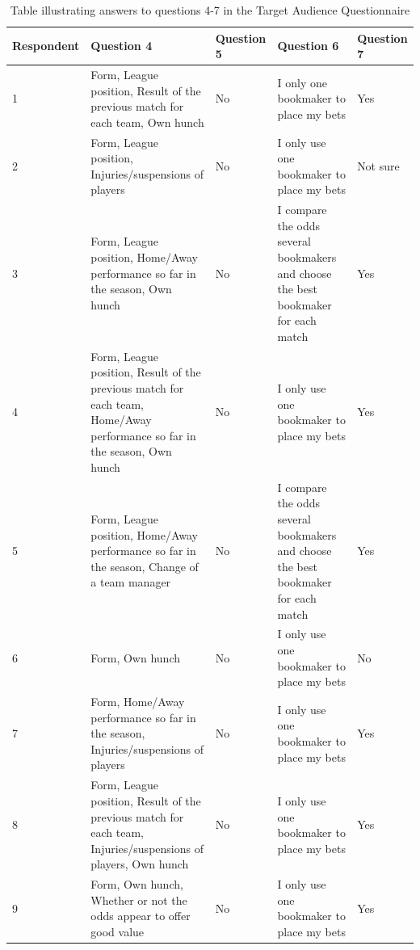 \noindent
\begin{table}
\begin{tabular}{
  |p{}%
  |p{}%
  |p{}%
  |p{}%
  |p{}|%
  }
  \hline
  \centering Respondent  & \centering Question 4  & \centering Question 5 &  \centering Question 6 & \centering\arraybackslash Question 7   \\ \hline
  1  & Form, League position, Result of the previous match for each team, Own hunch & No & I only one bookmaker to place my bets & Yes \\ \hline
  2 & Form, League position, Injuries/suspensions of players & No & I only use one bookmaker to place my bets & Not sure \\ \hline
  3 & Form, League position, Home/Away performance so far in the season, Own hunch & No & I compare the odds several bookmakers and choose the best bookmaker for each match & Yes \\ \hline
  4  & Form, League position, Result of the previous match for each team, Home/Away performance so far in the season, Own hunch & No & I only use one bookmaker to place my bets & Yes \\ \hline
   5 & Form, League position, Home/Away performance so far in the season, Change of a team manager & No & I compare the odds several bookmakers and choose the best bookmaker for each match & Yes \\ \hline
   6 & Form, Own hunch & No & I only use one bookmaker to place my bets & No \\ \hline
   7 & Form, Home/Away performance so far in the season, Injuries/suspensions of players & No & I only use one bookmaker to place my bets & Yes \\ \hline 
   8 & Form, League position, Result of the previous match for each team, Injuries/suspensions of players, Own hunch & No & I only use one bookmaker to place my bets & Yes \\ \hline
   9 & Form, Own hunch, Whether or not the odds appear to offer good value & No & I only use one bookmaker to place my bets & Yes \\ \hline
  \end{tabular}
 \caption{Table illustrating answers to questions 4-7 in the Target Audience Questionnaire}

\end{table}

